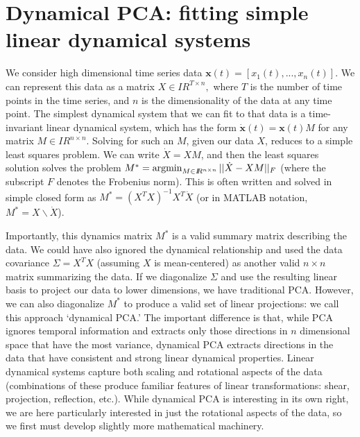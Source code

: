 \documentclass[11pt]{article}%
\def\x{{\mathbf x}}
\newcommand{\reals}{I\!\!R} %
\def\argmin{\qopname\relax n{argmin}}
\begin{document}
\section*{Dynamical PCA: fitting simple linear dynamical systems}
%
We consider high dimensional time series data $\x(t) = [x_1(t),...,x_n(t)].$  We can represent this data as a matrix $X \in \reals^{T \times n},$ where $T$ is the number of time points in the time series, and $n$ is the dimensionality of the data at any time point.  The simplest dynamical system that we can fit to that data is a time-invariant linear dynamical system, which has the form $\dot\x(t) = \x(t)M$ for any matrix $M\in\reals^{n \times n}$.  Solving for such an $M$, given our data $X$, reduces to a simple least squares problem.  We can write $\dot X = XM$, and then the least squares solution solves the problem $M^* = \argmin_{M \in \reals^{n \times n}} || \dot X - XM ||_F$ (where the subscript $F$ denotes the Frobenius norm).  This is often written and solved in simple closed form as $M^* =  (X^TX)^{-1}X^T\dot X$ (or in MATLAB notation,  $M^* = X\backslash\dot X$).

Importantly, this dynamics matrix $M^*$ is a valid summary matrix describing the data.  We could have also ignored the dynamical relationship and used the data covariance $\Sigma = X^TX$ (assuming $X$ is mean-centered) as another valid $n \times n$ matrix summarizing the data.  If we diagonalize $\Sigma$ and use the resulting linear basis to project our data to lower dimensions, we have traditional PCA.  However, we can also diagonalize $M^*$ to produce a valid set of linear projections: we call this approach `dynamical PCA.'  The important difference is that, while PCA ignores temporal information and extracts only those directions in $n$ dimensional space that have the most variance, dynamical PCA extracts directions in the data that have consistent and strong linear dynamical properties.  Linear dynamical systems capture both scaling and rotational aspects of the data (combinations of these produce familiar features of linear transformations: shear, projection, reflection, etc.).   While dynamical PCA is interesting in its own right, we are here particularly interested in just the rotational aspects of the data, so we first must develop slightly more mathematical machinery.
\end{document}
